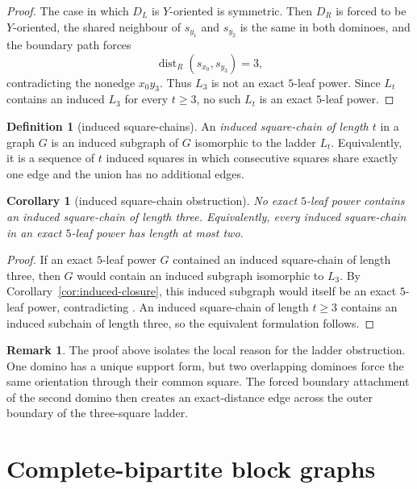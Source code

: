 \documentclass[11pt]{article}
\newtheorem{corollary}[theorem]{Corollary}
\theoremstyle{definition}
\newtheorem{definition}[theorem]{Definition}
\newtheorem{remark}[theorem]{Remark}
\newcommand{\dist}{\operatorname{dist}}
\begin{document}
\begin{proof}
The case in which $D_L$ is $Y$-oriented is symmetric.  Then $D_R$ is forced to be $Y$-oriented, the shared neighbour of $s_{y_1}$ and $s_{y_2}$ is the same in both dominoes, and the boundary path forces
\[
 \dist_R(s_{x_0},s_{y_3})=3,
\]
contradicting the nonedge $x_0y_3$.  Thus $L_3$ is not an exact $5$-leaf power.  Since $L_t$ contains an induced $L_3$ for every $t\ge3$, no such $L_t$ is an exact $5$-leaf power.
\end{proof}

\begin{definition}[induced square-chains]\label{def:induced-square-chain}
An \emph{induced square-chain of length $t$} in a graph $G$ is an induced subgraph of $G$ isomorphic to the ladder $L_t$.  Equivalently, it is a sequence of $t$ induced squares in which consecutive squares share exactly one edge and the union has no additional edges.
\end{definition}

\begin{corollary}[induced square-chain obstruction]\label{cor:square-chain-obstruction}
No exact $5$-leaf power contains an induced square-chain of length three.  Equivalently, every induced square-chain in an exact $5$-leaf power has length at most two.
\end{corollary}

\begin{proof}
If an exact $5$-leaf power $G$ contained an induced square-chain of length three, then $G$ would contain an induced subgraph isomorphic to $L_3$.  By Corollary~\ref{cor:induced-closure}, this induced subgraph would itself be an exact $5$-leaf power, contradicting .  An induced square-chain of length $t\ge3$ contains an induced subchain of length three, so the equivalent formulation follows.
\end{proof}


\begin{remark}
The proof above isolates the local reason for the ladder obstruction.  One domino has a unique support form, but two overlapping dominoes force the same orientation through their common square.  The forced boundary attachment of the second domino then creates an exact-distance edge across the outer boundary of the three-square ladder.
\end{remark}


\section{Complete-bipartite block graphs}\label{sec:block-complete-bipartite}
\end{document}
